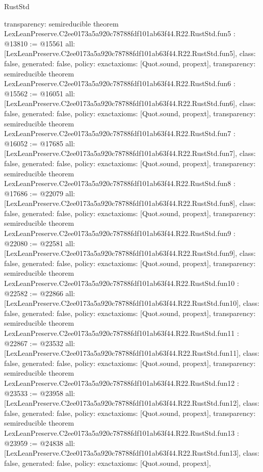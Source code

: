 \begin{lexlean}{RustStd}
\begin{coremodule}
{  transparency: semireducible
}
theorem LexLeanPreserve.C2ee0173a5a920c78788fdf101ab63f44.R22.RustStd.fun5 : @13810 := @15561 {
  all: [LexLeanPreserve.C2ee0173a5a920c78788fdf101ab63f44.R22.RustStd.fun5],
  class: false,
  generated: false,
  policy: exact{axioms: [Quot.sound, propext]},
  transparency: semireducible
}
theorem LexLeanPreserve.C2ee0173a5a920c78788fdf101ab63f44.R22.RustStd.fun6 : @15562 := @16051 {
  all: [LexLeanPreserve.C2ee0173a5a920c78788fdf101ab63f44.R22.RustStd.fun6],
  class: false,
  generated: false,
  policy: exact{axioms: [Quot.sound, propext]},
  transparency: semireducible
}
theorem LexLeanPreserve.C2ee0173a5a920c78788fdf101ab63f44.R22.RustStd.fun7 : @16052 := @17685 {
  all: [LexLeanPreserve.C2ee0173a5a920c78788fdf101ab63f44.R22.RustStd.fun7],
  class: false,
  generated: false,
  policy: exact{axioms: [Quot.sound, propext]},
  transparency: semireducible
}
theorem LexLeanPreserve.C2ee0173a5a920c78788fdf101ab63f44.R22.RustStd.fun8 : @17686 := @22079 {
  all: [LexLeanPreserve.C2ee0173a5a920c78788fdf101ab63f44.R22.RustStd.fun8],
  class: false,
  generated: false,
  policy: exact{axioms: [Quot.sound, propext]},
  transparency: semireducible
}
theorem LexLeanPreserve.C2ee0173a5a920c78788fdf101ab63f44.R22.RustStd.fun9 : @22080 := @22581 {
  all: [LexLeanPreserve.C2ee0173a5a920c78788fdf101ab63f44.R22.RustStd.fun9],
  class: false,
  generated: false,
  policy: exact{axioms: [Quot.sound, propext]},
  transparency: semireducible
}
theorem LexLeanPreserve.C2ee0173a5a920c78788fdf101ab63f44.R22.RustStd.fun10 : @22582 := @22866 {
  all: [LexLeanPreserve.C2ee0173a5a920c78788fdf101ab63f44.R22.RustStd.fun10],
  class: false,
  generated: false,
  policy: exact{axioms: [Quot.sound, propext]},
  transparency: semireducible
}
theorem LexLeanPreserve.C2ee0173a5a920c78788fdf101ab63f44.R22.RustStd.fun11 : @22867 := @23532 {
  all: [LexLeanPreserve.C2ee0173a5a920c78788fdf101ab63f44.R22.RustStd.fun11],
  class: false,
  generated: false,
  policy: exact{axioms: [Quot.sound, propext]},
  transparency: semireducible
}
theorem LexLeanPreserve.C2ee0173a5a920c78788fdf101ab63f44.R22.RustStd.fun12 : @23533 := @23958 {
  all: [LexLeanPreserve.C2ee0173a5a920c78788fdf101ab63f44.R22.RustStd.fun12],
  class: false,
  generated: false,
  policy: exact{axioms: [Quot.sound, propext]},
  transparency: semireducible
}
theorem LexLeanPreserve.C2ee0173a5a920c78788fdf101ab63f44.R22.RustStd.fun13 : @23959 := @24838 {
  all: [LexLeanPreserve.C2ee0173a5a920c78788fdf101ab63f44.R22.RustStd.fun13],
  class: false,
  generated: false,
  policy: exact{axioms: [Quot.sound, propext]},
}
\end{coremodule}
\end{lexlean}
